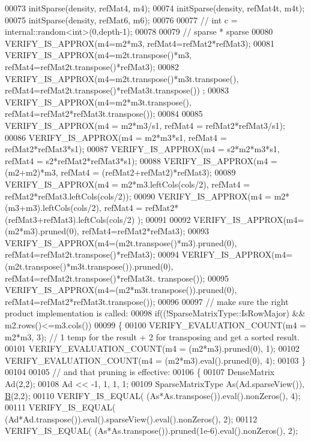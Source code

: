 \begin{DoxyCode}
00073     initSparse(density, refMat4,  m4);
00074     initSparse(density, refMat4t, m4t);
00075     initSparse(density, refMat6, m6);
00076 
00077 \textcolor{comment}{//     int c = internal::random<int>(0,depth-1);}
00078 
00079     \textcolor{comment}{// sparse * sparse}
00080     VERIFY\_IS\_APPROX(m4=m2*m3, refMat4=refMat2*refMat3);
00081     VERIFY\_IS\_APPROX(m4=m2t.transpose()*m3, refMat4=refMat2t.transpose()*refMat3);
00082     VERIFY\_IS\_APPROX(m4=m2t.transpose()*m3t.transpose(), refMat4=refMat2t.transpose()*refMat3t.transpose())
      ;
00083     VERIFY\_IS\_APPROX(m4=m2*m3t.transpose(), refMat4=refMat2*refMat3t.transpose());
00084 
00085     VERIFY\_IS\_APPROX(m4 = m2*m3/s1, refMat4 = refMat2*refMat3/s1);
00086     VERIFY\_IS\_APPROX(m4 = m2*m3*s1, refMat4 = refMat2*refMat3*s1);
00087     VERIFY\_IS\_APPROX(m4 = s2*m2*m3*s1, refMat4 = s2*refMat2*refMat3*s1);
00088     VERIFY\_IS\_APPROX(m4 = (m2+m2)*m3, refMat4 = (refMat2+refMat2)*refMat3);
00089     VERIFY\_IS\_APPROX(m4 = m2*m3.leftCols(cols/2), refMat4 = refMat2*refMat3.leftCols(cols/2));
00090     VERIFY\_IS\_APPROX(m4 = m2*(m3+m3).leftCols(cols/2), refMat4 = refMat2*(refMat3+refMat3).leftCols(cols/2)
      );
00091 
00092     VERIFY\_IS\_APPROX(m4=(m2*m3).pruned(0), refMat4=refMat2*refMat3);
00093     VERIFY\_IS\_APPROX(m4=(m2t.transpose()*m3).pruned(0), refMat4=refMat2t.transpose()*refMat3);
00094     VERIFY\_IS\_APPROX(m4=(m2t.transpose()*m3t.transpose()).pruned(0), refMat4=refMat2t.transpose()*refMat3t.
      transpose());
00095     VERIFY\_IS\_APPROX(m4=(m2*m3t.transpose()).pruned(0), refMat4=refMat2*refMat3t.transpose());
00096 
00097     \textcolor{comment}{// make sure the right product implementation is called:}
00098     \textcolor{keywordflow}{if}((!SparseMatrixType::IsRowMajor) && m2.rows()<=m3.cols())
00099     \{
00100       VERIFY\_EVALUATION\_COUNT(m4 = m2*m3, 3); \textcolor{comment}{// 1 temp for the result + 2 for transposing and get a sorted
       result.}
00101       VERIFY\_EVALUATION\_COUNT(m4 = (m2*m3).pruned(0), 1);
00102       VERIFY\_EVALUATION\_COUNT(m4 = (m2*m3).eval().pruned(0), 4);
00103     \}
00104 
00105     \textcolor{comment}{// and that pruning is effective:}
00106     \{
00107       DenseMatrix Ad(2,2);
00108       Ad << -1, 1, 1, 1;
00109       SparseMatrixType As(Ad.sparseView()), \hyperlink{group___core___module_class_eigen_1_1_matrix}{B}(2,2);
00110       VERIFY\_IS\_EQUAL( (As*As.transpose()).eval().nonZeros(), 4);
00111       VERIFY\_IS\_EQUAL( (Ad*Ad.transpose()).eval().sparseView().eval().nonZeros(), 2);
00112       VERIFY\_IS\_EQUAL( (As*As.transpose()).pruned(1e-6).eval().nonZeros(), 2);

\end{DoxyCode}

